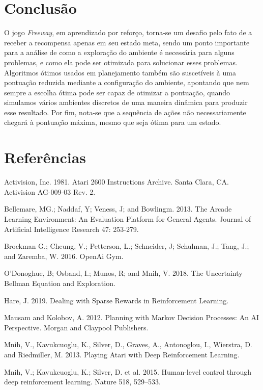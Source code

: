 \documentclass[letterpaper]{article} %
\begin{document}
\section{Conclusão}
O jogo \textit{Freeway}, em aprendizado por reforço, torna-se um desafio pelo fato de a  receber a recompensa apenas em seu estado meta, sendo um ponto importante para a análise de como a exploração do ambiente é necessária para alguns problemas, e como ela pode ser otimizada para solucionar esses problemas. Algoritmos ótimos usados em planejamento também são suscetíveis à uma pontuação reduzida mediante a configuração do ambiente, apontando que nem sempre a escolha ótima pode ser capaz de otimizar a pontuação, quando simulamos vários ambientes discretos de uma maneira dinâmica para produzir esse resultado. Por fim, nota-se que a sequência de ações não necessariamente chegará à pontuação máxima, mesmo que seja ótima para um estado.

\section{Referências}
\smallskip \noindent
Activision, Inc. 1981. Atari 2600 Instructions Archive. Santa Clara, CA. Activision AG-009-03 Rev. 2.

\smallskip \noindent
Bellemare, MG.; Naddaf, Y; Veness, J; and Bowlingm. 2013. The Arcade Learning Environment: An Evaluation Platform for General Agents. Journal of Artificial Intelligence Research 47: 253-279.

\smallskip \noindent
Brockman G.; Cheung, V.; Petterson, L.; Schneider, J; Schulman, J.; Tang, J.; and Zaremba, W. 2016. OpenAi Gym.

\smallskip \noindent
O'Donoghue, B; Osband, I.; Munos, R; and Mnih, V. 2018. The Uncertainty Bellman Equation and Exploration.

\smallskip \noindent
Hare, J. 2019. Dealing with Sparse Rewards in Reinforcement Learning.

\smallskip \noindent
Mausam and Kolobov, A. 2012. Planning with Markov Decision Processes: An AI Perspective. Morgan and Claypool Publishers.

\smallskip \noindent
Mnih, V., Kavukcuoglu, K., Silver, D., Graves, A., Antonoglou, I., Wierstra, D. and Riedmiller, M. 2013. Playing Atari with Deep Reinforcement Learning. 

\smallskip \noindent
Mnih, V.; Kavukcuoglu, K.; Silver, D. et al. 2015. Human-level control through deep reinforcement learning. Nature 518, 529–533.
\end{document}
